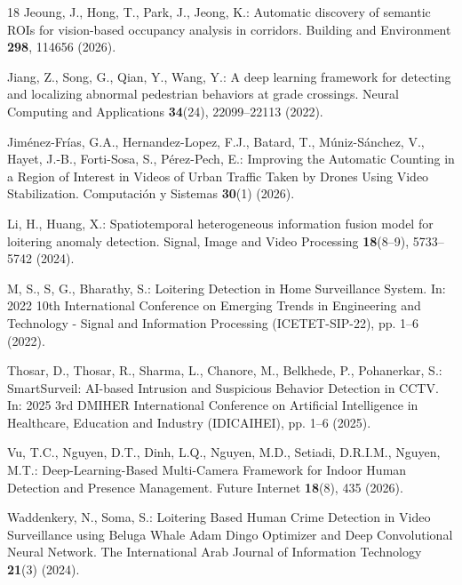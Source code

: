 \documentclass[runningheads]{llncs}
\begin{document}
\begin{thebibliography}{18}
Jeoung, J., Hong, T., Park, J., Jeong, K.: Automatic discovery of semantic ROIs for vision-based occupancy analysis in corridors. Building and Environment \textbf{298}, 114656 (2026). 

Jiang, Z., Song, G., Qian, Y., Wang, Y.: A deep learning framework for detecting and localizing abnormal pedestrian behaviors at grade crossings. Neural Computing and Applications \textbf{34}(24), 22099--22113 (2022). 

Jiménez-Frías, G.A., Hernandez-Lopez, F.J., Batard, T., Múniz-Sánchez, V., Hayet, J.-B., Forti-Sosa, S., Pérez-Pech, E.: Improving the Automatic Counting in a Region of Interest in Videos of Urban Traffic Taken by Drones Using Video Stabilization. Computación y Sistemas \textbf{30}(1) (2026). 

Li, H., Huang, X.: Spatiotemporal heterogeneous information fusion model for loitering anomaly detection. Signal, Image and Video Processing \textbf{18}(8--9), 5733--5742 (2024). 

M, S., S, G., Bharathy, S.: Loitering Detection in Home Surveillance System. In: 2022 10th International Conference on Emerging Trends in Engineering and Technology - Signal and Information Processing (ICETET-SIP-22), pp. 1--6 (2022). 

Thosar, D., Thosar, R., Sharma, L., Chanore, M., Belkhede, P., Pohanerkar, S.: SmartSurveil: AI-based Intrusion and Suspicious Behavior Detection in CCTV. In: 2025 3rd DMIHER International Conference on Artificial Intelligence in Healthcare, Education and Industry (IDICAIHEI), pp. 1--6 (2025). 

Vu, T.C., Nguyen, D.T., Dinh, L.Q., Nguyen, M.D., Setiadi, D.R.I.M., Nguyen, M.T.: Deep-Learning-Based Multi-Camera Framework for Indoor Human Detection and Presence Management. Future Internet \textbf{18}(8), 435 (2026). 

Waddenkery, N., Soma, S.: Loitering Based Human Crime Detection in Video Surveillance using Beluga Whale Adam Dingo Optimizer and Deep Convolutional Neural Network. The International Arab Journal of Information Technology \textbf{21}(3) (2024). 


\end{thebibliography}
\end{document}

